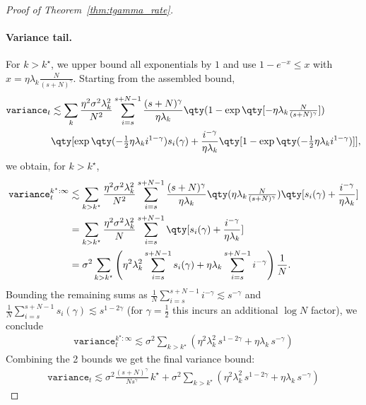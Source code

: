 \documentclass{article}
\def\variance{\mathtt{variance}}
\def\variance{\mathtt{variance}}
\theoremstyle{plain}
\def\variance{\mathtt{variance}}
\begin{document}
\begin{proof}[Proof of Theorem~\ref{thm:tgamma_rate}]
\paragraph{Variance tail.}
For \(k > k^\star\), we upper bound all exponentials by \(1\) and use
\(1-e^{-x}\le x\) with \(x=\eta\lambda_k \tfrac{N}{(s+N)^\gamma}\). Starting from the assembled bound,
\begin{align*}
\variance_t
&\lesssim
\sum_{k}\frac{\eta^2 \sigma^2 \lambda_k^2}{N^2} \sum_{i=s}^{s+N-1}
\frac{(s+N)^\gamma}{\eta \lambda_k}
\qty(1 - \exp\qty[-\eta \lambda_k \tfrac{N}{(s+N)^\gamma}])\\
&\qty[\exp\qty(-\tfrac{1}{2}\eta \lambda_k i^{1-\gamma}) s_i(\gamma)
+ \frac{i^{-\gamma}}{\eta \lambda_k} \qty[1 - \exp\qty(-\tfrac{1}{2} \eta \lambda_k i^{1-\gamma})]] ,
\end{align*}
we obtain, for \(k>k^\star\),
\begin{align*}
\variance_t^{k^\star:\infty}
&\lesssim
\sum_{k>k^\star}\frac{\eta^2 \sigma^2 \lambda_k^2}{N^2} \sum_{i=s}^{s+N-1}
\frac{(s+N)^\gamma}{\eta \lambda_k}
\qty(\eta \lambda_k \tfrac{N}{(s+N)^\gamma})
\qty[s_i(\gamma) + \frac{i^{-\gamma}}{\eta \lambda_k}] \\
&=
\sum_{k>k^\star}\frac{\eta^2 \sigma^2 \lambda_k^2}{N} \sum_{i=s}^{s+N-1}
\qty[s_i(\gamma) + \frac{i^{-\gamma}}{\eta \lambda_k}] \\
&=
\sigma^2
\sum_{k>k^\star}
\left(
    \eta^2 \lambda_k^2\sum_{i=s}^{s+N-1} s_i(\gamma)
    + \eta \lambda_k \sum_{i=s}^{s+N-1} i^{-\gamma}
\right)\frac{1}{N}.
\end{align*}
Bounding the remaining sums as
\(
\frac{1}{N}\sum_{i=s}^{s+N-1} i^{-\gamma}\lesssim s^{-\gamma}
\)
and
\(
\frac{1}{N}\sum_{i=s}^{s+N-1} s_i(\gamma)\lesssim s^{1-2\gamma}
\)
(for \(\gamma=\tfrac12\) this incurs an additional \(\log N\) factor),
we conclude
\begin{align}
\variance_t^{k^\star:\infty}
\lesssim
\sigma^2
\sum_{k>k^\star}
\left(
    \eta^2 \lambda_k^2\, s^{1-2\gamma}
    + \eta \lambda_k\, s^{-\gamma}
\right)
\end{align}
Combining the 2 bounds we get the final variance bound:
\begin{align}
    \variance_t \lesssim \sigma^2
\frac{(s+N)^\gamma}{N s^\gamma}\, k^\star + \sigma^2
\sum_{k>k^\star}
\left(
    \eta^2 \lambda_k^2\, s^{1-2\gamma}
    + \eta \lambda_k\, s^{-\gamma}
\right)
\end{align}
\end{proof}
\end{document}
